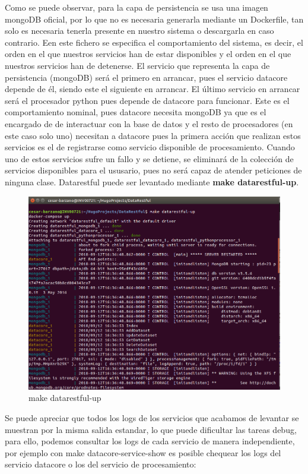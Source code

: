 \documentclass[a4paper,11pt]{book}
\begin{document}
Como se puede observar, para la capa de persistencia se usa una imagen mongoDB oficial, por lo que no es necesaria generarla mediante un Dockerfile, tan solo es necesaria tenerla presente en nuestro sistema o descargarla en caso contrario. Een este fichero se especifica el comportamiento del sistema, es decir, el orden en el que nuestros servicios han de estar disponibles y el orden en el que nuestros servicios han de detenerse.  El servicio que representa la capa de persistencia (mongoDB) será el primero en arrancar, pues el servicio datacore depende de él, siendo este el siguiente en arrancar. El último servicio en arrancar será el procesador python pues depende de datacore para funcionar. Este es el comportamiento nominal, pues datacore necesita mongoDB ya que es el encargado de de interactuar con la base de datos y el resto de procesadores (en este caso solo uno) necesitan a datacore pues la primera acción que realizan estos servicios es el de registrarse como servicio disponible de procesamiento. Cuando uno de estos servicios sufre un fallo y se detiene, se eliminará de la colección de servicios disponibles para el ususario, pues no será capaz de atender peticiones de ninguna clase. Datarestful puede ser levantado mediante \textbf{make datarestful-up}. 

\begin{figure}[H]  
\centering 
\includegraphics[scale=0.35]{imagenes/make_datarestful_up.png}
\caption{ make datarestful-up }  
\end{figure} 

Se puede apreciar que todos los logs de los servicios que acabamos de levantar se muestran por la misma salida estandar, lo que puede dificultar las tareas debug, para ello, podemos consultar los logs de cada servicio de manera independiente, por ejemplo con make datacore-service-show es posible chequear los logs del servicio datacore o los del servicio de procesamiento:
\end{document}
